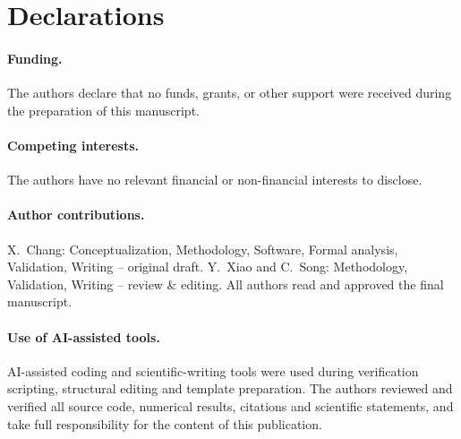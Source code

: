 \documentclass[twocolumn,epjc3]{svjour3}
\begin{document}
\section*{Declarations}
\paragraph{Funding.}
The authors declare that no funds, grants, or other support were received during
the preparation of this manuscript.

\paragraph{Competing interests.}
The authors have no relevant financial or non-financial interests to disclose.

\paragraph{Author contributions.}
X.~Chang: Conceptualization, Methodology, Software, Formal analysis, Validation,
Writing -- original draft. Y.~Xiao and C.~Song: Methodology, Validation,
Writing -- review \& editing. All authors read and approved the final
manuscript.

\paragraph{Use of AI-assisted tools.}
AI-assisted coding and scientific-writing tools were used during verification
scripting, structural editing and template preparation. The authors reviewed
and verified all source code, numerical results, citations and scientific
statements, and take full responsibility for the content of this publication.

\begingroup
\raggedright


\endgroup
\end{document}
